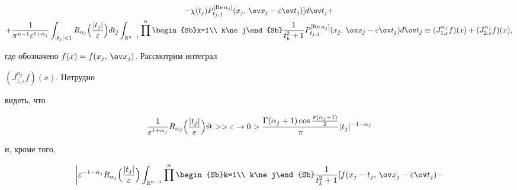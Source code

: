 \begin{pf}
\begin{multline*}
-\chi(t_j) P^{[\re\alpha_j]}_{t_j,j}


(x_j,\,\ov x_j-\varepsilon\ov t_j)]d\ov t_j+ \\


+\frac{1}{\pi^{n-1}\varepsilon^{1+\alpha_j}}


\int_{|t_j|<1}R_{\alpha_j}\Bigl(


\frac{|t_j|}{\varepsilon}\Bigr) dt_j


\int_{\Bbb R^{n-1}}


\prod^n\begin{Sb}k=1\\ k\ne j\end{Sb}


\frac{1}{t^2_k+1}


P^{[\re\alpha_j]}_{t_j,j}(x_j,\,\ov x_j-\varepsilon\ov t_j)


d\ov t_j\equiv


(J^{\alpha_j}_{1,\varepsilon}f)(x)+


(J^{\alpha_j}_{2,\varepsilon}f)(x),


\end{multline*}


где обозначено $f(x)=f(x_j,\,\ov x_j)$. Рассмотрим интеграл


$(J^{\alpha_j}_{1,\varepsilon}f)(x)$. Нетрудно


видеть, что


\begin{equation}


\frac{1}{\varepsilon^{1+\alpha_j}}R_{\alpha_j}\Bigl(


\frac{|t_j|}{\varepsilon}\Bigr)@>>{\varepsilon\to 0}>


\frac{\Gamma(\alpha_j+1)\cos


\frac{\pi(\alpha_j+1)}{2}}{\pi}


|t_j|^{-1-\alpha_j}


\end{equation}


и, кроме того,


\begin{multline}


\biggl|\varepsilon^{-1-\alpha_j}R_{\alpha_j}\Bigl(


\frac{|t_j|}{\varepsilon}\Bigr)\int_{\Bbb R^{n-1}}


\prod^n\begin{Sb}k=1\\ k\ne j\end{Sb}


\frac{1}{t^2_k+1}[f(x_j-t_j,\,\ov x_j-\varepsilon\ov t_j)-



\end{multline}
\end{pf}
